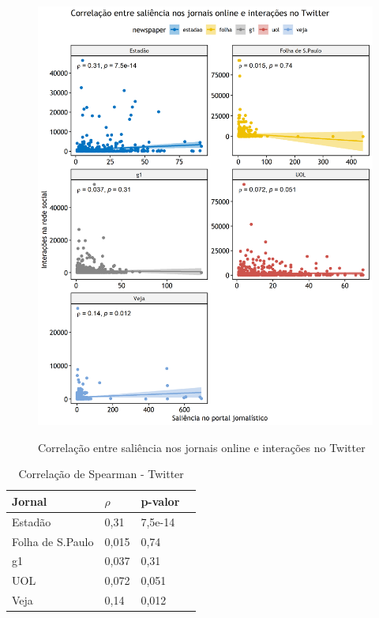 \documentclass[
	12pt,
	oneside,
	a4paper,
	english,
	brazil
]{abntex2ppgsi}
\begin{document}
\begin{figure}[H]
	\centering
 	  \caption{Correlação entre saliência nos jornais online e interações no Twitter}
		\includegraphics{twitter.png}
	\label{fig:correlacao-twitter}
\end{figure}

\begin{table}[H]
	\centering
	\caption{Correlação de Spearman - Twitter}
		\begin{tabular}{p{2in} p{1in} p{1in} p{1in} } \hline

		Jornal & $\rho$ & p-valor \\ \hline
		Estadão	& 0,31 & 7,5e-14 \\ 
		Folha de S.Paulo & 0,015 & 0,74 \\ 
		g1	& 0,037 & 0,31 \\ 
		UOL	& 0,072 & 0,051 \\ 
		Veja & 0,14 & 0,012 \\ \hline
		
		\end{tabular}
	\label{tab:correlacao-twitter}
\end{table}
\end{document}
